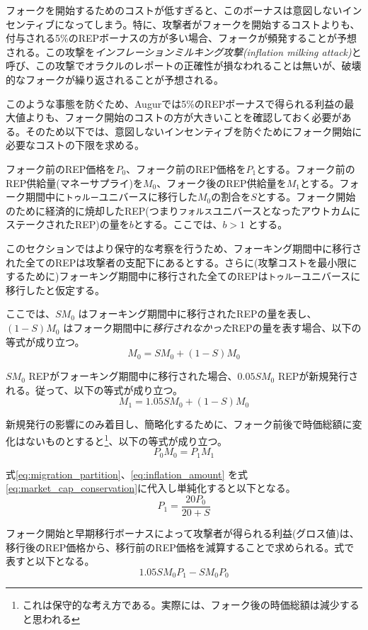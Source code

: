 \documentclass[floatfix,reprint,nofootinbib,amsmath,amssymb,epsfig,pre,floats,letterpaper,groupedaffiliation]{revtex4-1}
\newcommand{\beq}{\begin{equation}}
\newcommand{\eeq}{\end{equation}}
\theoremstyle{definition}
\theoremstyle{definition}
\theoremstyle{definition}
\begin{document}
\begin{appendix}
フォークを開始するためのコストが低すぎると、このボーナスは意図しないインセンティブになってしまう。特に、攻撃者がフォークを開始するコストよりも、付与される5\%のREPボーナスの方が多い場合、フォークが頻発することが予想される。この攻撃を\emph{インフレーションミルキング攻撃(inflation milking attack)}と呼び、この攻撃でオラクルのレポートの正確性が損なわれることは無いが、破壊的なフォークが繰り返されることが予想される。

このような事態を防ぐため、Augurでは5\%のREPボーナスで得られる利益の最大値よりも、フォーク開始のコストの方が大きいことを確認しておく必要がある。そのため以下では、意図しないインセンティブを防ぐためにフォーク開始に必要なコストの下限を求める。

フォーク前のREP価格を$P_0$、フォーク前のREP価格を$P_1$とする。フォーク前のREP供給量(マネーサプライ)を$M_0$、フォーク後のREP供給量を$M_1$とする。フォーク期間中に\texttt{トゥルー}ユニバースに移行した$M_0$の割合を$S$とする。フォーク開始のために経済的に焼却したREP(つまり\texttt{フォルス}ユニバースとなったアウトカムにステークされたREP)の量を$b$とする。ここでは、$b > 1$ とする。

このセクションではより保守的な考察を行うため、フォーキング期間中に移行された全てのREPは攻撃者の支配下にあるとする。さらに(攻撃コストを最小限にするために)フォーキング期間中に移行された全てのREPは\texttt{トゥルー}ユニバースに移行したと仮定する。

ここでは、$SM_0$ はフォーキング期間中に移行されたREPの量を表し、$(1-S)M_{0}$ はフォーク期間中に\emph{移行されなかった}REPの量を表す場合、以下の等式が成り立つ。
\beq\label{eq:migration_partition}
M_{0}=SM_{0}+(1-S)M_{0}
\eeq

$SM_{0}$ REPがフォーキング期間中に移行された場合、$0.05SM_{0}$ REPが新規発行される。従って、以下の等式が成り立つ。
\beq\label{eq:inflation_amount}
M_{1}=1.05SM_{0}+(1-S)M_{0}
\eeq

新規発行の影響にのみ着目し、簡略化するために、フォーク前後で時価総額に変化はないものとすると\footnote{これは保守的な考え方である。実際には、フォーク後の時価総額は減少すると思われる}、以下の等式が成り立つ。
\beq\label{eq:market_cap_conservation}
P_{0}M_{0}=P_{1}M_{1}
\eeq

式\ref{eq:migration_partition}、\ref{eq:inflation_amount} を式\ref{eq:market_cap_conservation}に代入し単純化すると以下となる。
\beq\label{eq:price_relation_after_fork}
P_{1}=\frac{20P_{0}}{20+S}
\eeq

フォーク開始と早期移行ボーナスによって攻撃者が得られる利益(グロス値)は、移行後のREP価格から、移行前のREP価格を減算することで求められる。式で表すと以下となる。
\beq\label{eq:gross_benefit_of_forking_v1}
1.05SM_{0}P_{1}-SM_{0}P_{0}
\eeq


\end{appendix}
\end{document}
